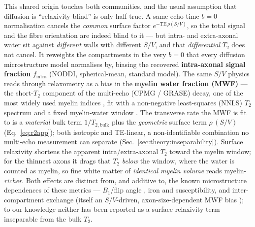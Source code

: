 This shared origin touches both communities, and the usual assumption that diffusion is
``relaxivity-blind'' is only half true. A same-echo-time $b{=}0$ normalisation cancels the
\emph{common} surface factor $e^{-\mathrm{TE}\,\rho(S/V)}$, so the total signal and the fibre
orientation are indeed blind to it --- but intra- and extra-axonal water sit against
\emph{different} walls with different $S/V$, and that \emph{differential} $T_2$ does not
cancel. It reweights the compartments in the very $b{=}0$ that every diffusion microstructure
model normalises by, biasing the recovered \textbf{intra-axonal signal fraction}
$f_{\mathrm{intra}}$ (NODDI, spherical-mean, standard model). The same $S/V$ physics reads
through relaxometry as a bias in the \textbf{myelin water fraction (MWF)} --- the short-$T_2$
component of the multi-echo (CPMG / GRASE) decay, one of the most widely used myelin indices
\citep{Mackay1994, Laule2007, Whittall1997}, fit with a non-negative least-squares (NNLS)
$T_2$ spectrum and a fixed myelin-water window \citep{Whittall1997, Prasloski2012}. The
transverse rate the MWF is fit to is a \emph{material} bulk term $1/T_{2,\mathrm{bulk}}$ plus
the \emph{geometric} surface term $\rho\,(S/V)$ (Eq.~\eqref{eq:r2app}); both isotropic and
TE-linear, a non-identifiable combination no multi-echo measurement can separate
(Sec.~\ref{sec:theory:inseparability}). Surface relaxivity shortens the apparent
intra/extra-axonal $T_2$ toward the myelin window; for the thinnest axons it drags that $T_2$
\emph{below} the window, where the water is counted as myelin, so fine white matter of
\emph{identical myelin volume} reads myelin-\emph{richer}. Both effects are distinct from, and
additive to, the known microstructure dependences of these metrics --- $B_1$/flip angle
\citep{Prasloski2012, Lebel2010}, iron and susceptibility, and inter-compartment exchange
(itself an $S/V$-driven, axon-size-dependent MWF bias \citep{Harkins2012, Dula2010}); to our
knowledge neither has been reported as a surface-relaxivity term inseparable from the bulk
$T_2$.

